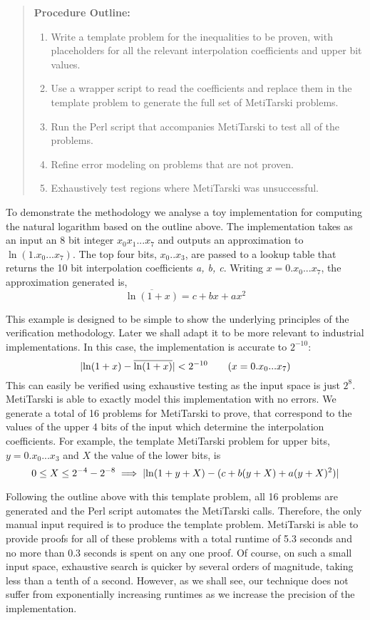 \begin{quotation}
\textbf{Procedure Outline:}
\begin{enumerate}
\item Write a template problem for the inequalities to be proven, with placeholders for all the relevant interpolation coefficients and upper bit values.
\item Use a wrapper script to read the coefficients and replace them in the template problem to generate the full set of MetiTarski problems.
\item Run the Perl script that accompanies MetiTarski to test all of the problems.
\item Refine error modeling on problems that are not proven.
\item Exhaustively test regions where MetiTarski was unsuccessful.
\end{enumerate}  
\end{quotation}

To demonstrate the methodology we analyse a toy implementation for computing the natural logarithm based on the outline above. The implementation takes as an input an 8 bit integer $x_0x_1...x_7$ and outputs an approximation to $\ln(1.x_0...x_7)$. The top four bits, $x_0..x_3$, are passed to a lookup table that returns the 10 bit interpolation coefficients \textit{a, b, c}. Writing $x=0.x_0...x_7$, the approximation generated is,
$$ \overline{\ln(1+x)}=c + bx +ax^2 $$

This example is designed to be simple to show the underlying principles of the verification methodology. Later we shall adapt it to be more relevant to industrial implementations. In this case, the implementation is accurate to $2^{-10}$:
$$\lvert\ln(1+x)-\overline{\ln(1+x)}\rvert <2^{-10} \qquad (x= 0.x_0...x_7) $$
This can easily be verified using exhaustive testing as the input space is just $2^8$. MetiTarski is able to exactly model this implementation with no errors. We generate a total of 16 problems for MetiTarski to prove, that correspond to the values of the upper 4 bits of the input which determine the interpolation coefficients. For example, the template MetiTarski problem for upper bits, $y=0.x_0...x_3$ and $X$ the value of the lower bits, is
$$ 0\le X \le 2^{-4}-2^{-8} \implies \lvert\ln(1+y+X)-(c+b(y+X)+a(y+X)^2)\rvert $$

Following the outline above with this template problem, all 16 problems are generated and the Perl script automates the MetiTarski calls. Therefore, the only manual input required is to produce the template problem. MetiTarski is able to provide proofs for all of these problems with a total runtime of 5.3 seconds and no more than 0.3 seconds is spent on any one proof. Of course, on such a small input space, exhaustive search is quicker by several orders of magnitude, taking less than a tenth of a second. However, as we shall see, our technique does not suffer from exponentially increasing runtimes as we increase the precision of the implementation.

